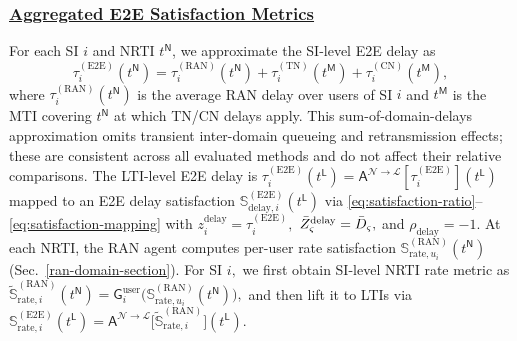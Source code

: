 \documentclass[12pt,lettersize,journal,onecolumn]{IEEEtran}
\begin{document}
\subsubsection{\underline{Aggregated E2E Satisfaction Metrics}} %
For each SI $i$ and NRTI $t^\mathsf{N}$, we approximate the SI-level E2E delay as
$$\tau^{\mathrm{(E2E)}}_{i}(t^\mathsf{N})=\tau^{\mathrm{(RAN)}}_{i}(t^\mathsf{N})+\tau^{\mathrm{(TN)}}_{i}(t^\mathsf{M})+\tau^{\mathrm{(CN)}}_{i}(t^\mathsf{M}),$$
where $\tau^{\mathrm{(RAN)}}_{i}(t^\mathsf{N})$ is the average RAN delay over users of SI $i$ and $t^\mathsf{M}$ is the MTI covering $t^\mathsf{N}$ at which TN/CN delays apply. This sum-of-domain-delays approximation omits transient inter-domain queueing and retransmission effects; these are consistent across all evaluated methods and do not affect their relative comparisons. The LTI-level E2E delay is 
$\tau^{\mathrm{(E2E)}}_{i}(t^\mathsf{L}) = \mathsf{A}^{\mathscr{N}\rightarrow\mathscr{L}}[\tau^{\mathrm{(E2E)}}_{i}](t^\mathsf{L})$ 
mapped to an E2E delay satisfaction
$\mathbb{S}^{\mathrm{(E2E)}}_{\mathrm{delay},i}(t^\mathsf{L})$
via \eqref{eq:satisfaction-ratio}--\eqref{eq:satisfaction-mapping} with
$z^{\mathrm{delay}}_{i}=\tau^{\mathrm{(E2E)}}_{i},$
$\Bar{Z}^{\mathrm{delay}}_{\varsigma}=\Bar{D}_{\varsigma},$
and 
$\rho_{\mathrm{delay}}=-1$.
At each NRTI, the RAN agent computes per-user rate satisfaction
$\mathbb{S}^{\mathrm{(RAN)}}_{\mathrm{rate},u_{i}}(t^\mathsf{N})$ (Sec.~\ref{ran-domain-section}). For SI $i,$ we first obtain SI-level NRTI rate metric as
$\tilde{\mathbb{S}}^{\mathrm{(RAN)}}_{\mathrm{rate},i}(t^\mathsf{N})
=
\mathsf{G}^{\mathrm{user}}_{i}\big(
\mathbb{S}^{\mathrm{(RAN)}}_{\mathrm{rate},u_{i}}(t^\mathsf{N})
\big) ,
$
and then lift it to LTIs via
$\mathbb{S}^{\mathrm{(E2E)}}_{\mathrm{rate},i}(t^\mathsf{L})
=
\mathsf{A}^{\mathscr{N}\rightarrow\mathscr{L}}\bigl[\tilde{\mathbb{S}}^{\mathrm{(RAN)}}_{\mathrm{rate},i}\bigr](t^\mathsf{L}) .
$
\end{document}
